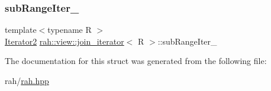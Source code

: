 \subsubsection{\texorpdfstring{subRangeIter\_}{subRangeIter\_}}
{\footnotesize\ttfamily template$<$typename R $>$ \\
\mbox{\hyperlink{structrah_1_1view_1_1join__iterator_ae03a066174f3422c70d0e3c22e68d9f7}{Iterator2}} \mbox{\hyperlink{structrah_1_1view_1_1join__iterator}{rah\+::view\+::join\+\_\+iterator}}$<$ R $>$\+::sub\+Range\+Iter\+\_\+}



The documentation for this struct was generated from the following file\+:\begin{DoxyCompactItemize}
\item 
rah/\mbox{\hyperlink{rah_8hpp}{rah.\+hpp}}\end{DoxyCompactItemize}
